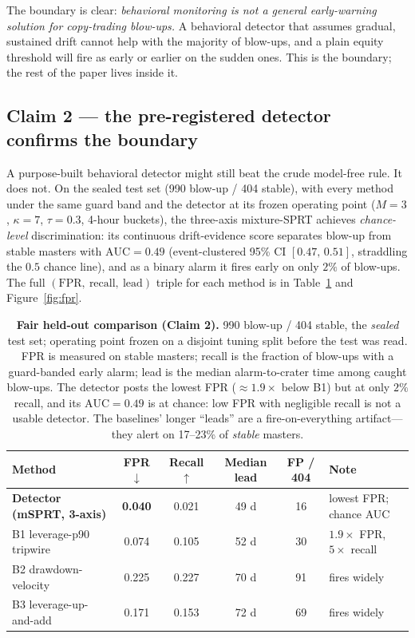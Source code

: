 \documentclass[11pt,a4paper]{article}
\newcommand{\fpr}{\mathrm{FPR}}
\begin{document}
The boundary is clear: \emph{behavioral monitoring is not a general
early-warning solution for copy-trading blow-ups.} A behavioral detector that
assumes gradual, sustained drift cannot help with the majority of blow-ups, and a
plain equity threshold will fire as early or earlier on the sudden ones. This is
the boundary; the rest of the paper lives inside it.

\subsection{Claim 2 --- the pre-registered detector confirms the boundary}
\label{sec:fair}

A purpose-built behavioral detector might still beat the crude model-free rule. It
does not. On the sealed test set (990 blow-up / 404 stable), with every method under
the same guard band and the detector at its frozen operating point ($M=3$,
$\kappa=7$, $\tau=0.3$, 4-hour buckets), the three-axis mixture-SPRT achieves
\emph{chance-level} discrimination: its continuous drift-evidence score separates
blow-up from stable masters with $\mathrm{AUC}=0.49$ (event-clustered 95\% CI
$[0.47,\,0.51]$, straddling the $0.5$ chance line), and as a binary alarm it fires
early on only $2\%$ of blow-ups. The
full $(\fpr,\ \text{recall},\ \text{lead})$ triple for each method is in
Table~\ref{tab:fair} and Figure~\ref{fig:fpr}.

\begin{table}[t]
  \centering
  \caption{\textbf{Fair held-out comparison (Claim 2).} 990 blow-up / 404 stable,
  the \emph{sealed} test set; operating point frozen on a disjoint tuning split
  before the test was read. FPR is measured on stable masters; recall is the
  fraction of blow-ups with a guard-banded early alarm; lead is the median
  alarm-to-crater time among caught blow-ups. The detector posts the lowest FPR
  ($\approx 1.9\times$ below B1) but at only $2\%$ recall, and its $\mathrm{AUC}=0.49$
  is at chance: low FPR with negligible recall is not a usable detector. The
  baselines' longer ``leads'' are a fire-on-everything artifact---they alert on
  17--23\% of \emph{stable} masters.}
  \label{tab:fair}
  \small
  \setlength{\tabcolsep}{5pt}
  \begin{tabular}{@{}lccccl@{}}
    \toprule
    Method & FPR $\downarrow$ & Recall $\uparrow$ & Median lead & FP / 404 & Note \\
    \midrule
    \textbf{Detector (mSPRT, 3-axis)} & \textbf{0.040} & 0.021 & 49 d & 16 & lowest FPR; chance AUC \\
    B1 \;leverage-p90 tripwire        & 0.074 & 0.105 & 52 d & 30 & $1.9\times$ FPR, $5\times$ recall \\
    B2 \;drawdown-velocity            & 0.225 & 0.227 & 70 d & 91 & fires widely \\
    B3 \;leverage-up-and-add          & 0.171 & 0.153 & 72 d & 69 & fires widely \\
    \bottomrule
  \end{tabular}
\end{table}
\end{document}
